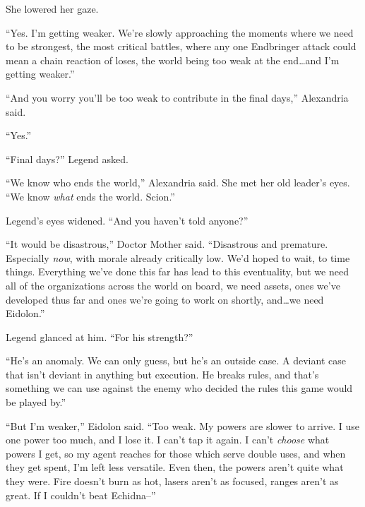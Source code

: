 She lowered her gaze.



``Yes.  I'm getting weaker.  We're slowly approaching the moments where we need to be strongest, the most critical battles, where any one Endbringer attack could mean a chain reaction of loses, the world being too weak at the end\ldots and I'm getting weaker.''



``And you worry you'll be too weak to contribute in the final days,'' Alexandria said.



``Yes.''



``Final days?'' Legend asked.



``We know who ends the world,'' Alexandria said.  She met her old leader's eyes.  ``We know \emph{what} ends the world.  Scion.''



Legend's eyes widened.  ``And you haven't told anyone?''



``It would be disastrous,'' Doctor Mother said.  ``Disastrous and premature.  Especially \emph{now}, with morale already critically low.  We'd hoped to wait, to time things.  Everything we've done this far has lead to this eventuality, but we need all of the organizations across the world on board, we need assets, ones we've developed thus far and ones we're going to work on shortly, and\ldots we need Eidolon.''



Legend glanced at him.  ``For his strength?''



``He's an anomaly.  We can only guess, but he's an outside case.  A deviant case that isn't deviant in anything but execution.  He breaks rules, and that's something we can use against the enemy who decided the rules this game would be played by.''



``But I'm weaker,'' Eidolon said.  ``Too weak. My powers are slower to arrive.  I use one power too much, and I lose it.  I can't tap it again.  I can't \emph{choose} what powers I get, so my agent reaches for those which serve double uses, and when they get spent, I'm left less versatile.  Even then, the powers aren't quite what they were.  Fire doesn't burn as hot, lasers aren't as focused, ranges aren't as great.  If I couldn't beat Echidna--''



